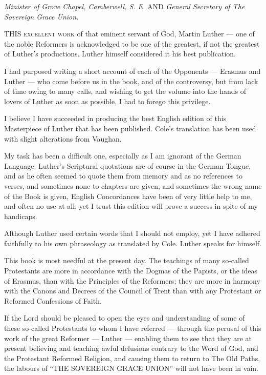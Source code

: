 
\emph{Minister of Grove Chapel, Camberwell, S. E.}  \textsc{AND} \emph{General Secretary of The Sovereign Grace Union.}

THIS \textsc{excellent work} of that eminent servant of God, Martin Luther — one of the noble Reformers is acknowledged to be one of the greatest, if not the greatest of Luther’s productions. Luther himself considered it his best publication.

I had purposed writing a short account of each of the Opponents — Erasmus and Luther — who come before us in the book, and of the controversy, but from lack of time owing to many calls, and wishing to get the volume into the hands of lovers of Luther as soon as possible, I had to forego this privilege.

I believe I have succeeded in producing the best English edition of this Masterpiece of Luther that has been published. Cole’s translation has been used with slight alterations from Vaughan.

My task has been a difficult one, especially as I am ignorant of the German Language. Luther’s Scriptural quotations are of course in the German Tongue, and as he often seemed to quote them from memory and as no references to verses, and sometimes none to chapters are given, and sometimes the wrong name of the Book is given, English Concordances have been of very little help to me, and often no use at all; yet I trust this edition will prove a success in spite of my handicaps.

Although Luther used certain words that I should not employ, yet I have adhered faithfully to his own phraseology as translated by Cole. Luther speaks for himself.

This book is most needful at the present day. The teachings of many so-called Protestants are more in accordance with the Dogmas of the Papists, or the ideas of Erasmus, than with the Principles of the Reformers; they are more in harmony with the Canons and Decrees of the Council of Trent than with any Protestant or Reformed Confessions of Faith.

If the Lord should be pleased to open the eyes and understanding of some of these so-called Protestants to whom I have referred — through the perusal of this work of the great Reformer — Luther — enabling them to see that they are at present believing and teaching awful delusions contrary to the Word of God, and the Protestant Reformed Religion, and causing them to return to The Old Paths, the labours of “\textsc{THE SOVEREIGN GRACE UNION}” will not have been in vain.


